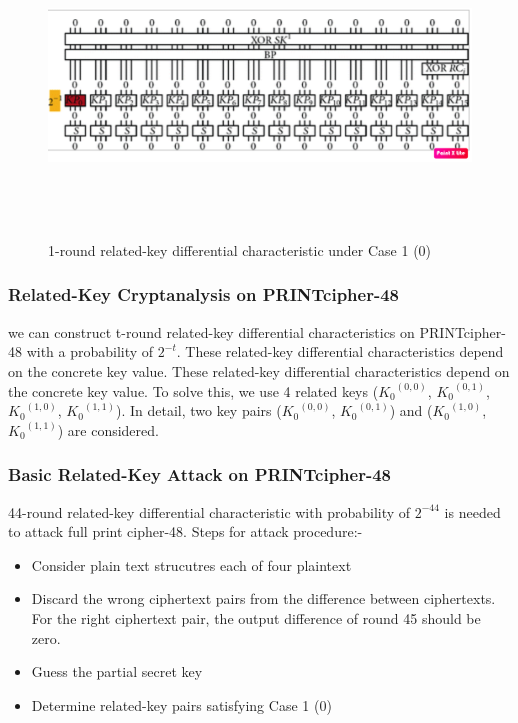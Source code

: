 \documentclass[journal=tosc,preprint]{iacrtrans}
\begin{document}
\begin{figure}[ht]
	\centering
	\includegraphics[height=8cm, width=12cm]{pics/oneround.png}
	\caption{1-round related-key differential characteristic under Case 1 (0)}
\end{figure}


\newpage
\subsubsection{Related-Key Cryptanalysis on PRINTcipher-48}
we can construct t-round related-key differential characteristics on PRINTcipher-48 with a probability of \(2^{-t}\). These related-key differential characteristics depend on the concrete key value. These related-key differential characteristics depend on the concrete key value. To solve this, we use 4 related keys (\({K_0}^{(0,0)}\), \({K_0}^{(0,1)}\), \({K_0}^{(1,0)}\), \({K_0}^{(1,1)}\)). In detail, two key pairs (\({K_0}^{(0,0)}\), \({K_0}^{(0,1)}\)) and (\({K_0}^{(1,0)}\), \({K_0}^{(1,1)}\)) are considered.

\subsubsection{Basic Related-Key Attack on PRINTcipher-48}
44-round related-key differential characteristic with probability of \(2^{-44}\) is needed to attack full print cipher-48.
Steps for attack procedure:-
\begin{itemize}
	\item Consider plain text strucutres each of four plaintext
	\item Discard the wrong ciphertext pairs from the difference between ciphertexts. For the right ciphertext pair, the output difference of round 45 should be zero.
	\item Guess the partial secret key
	\item Determine related-key pairs satisfying Case 1 (0)
\end{itemize}
\end{document}
